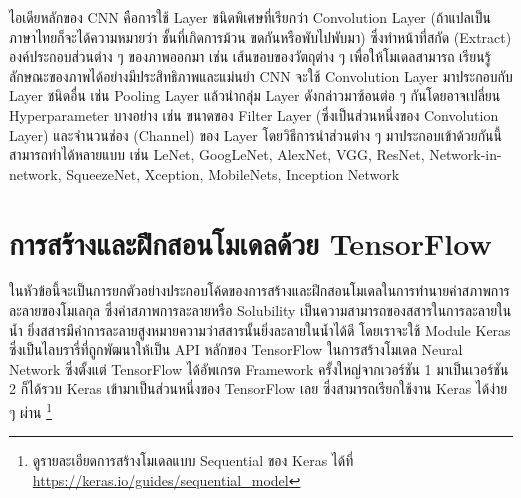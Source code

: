 ไอเดียหลักของ CNN คือการใช้ Layer ชนิดพิเศษที่เรียกว่า Convolution Layer (ถ้าแปลเป็นภาษาไทยก็จะได้ความหมายว่า ชั้นที่เกิดการม้วน%
ขดกันหรือพับไปพับมา) ซึ่งทำหน้าที่สกัด (Extract) องค์ประกอบส่วนต่าง ๆ ของภาพออกมา เช่น เส้นขอบของวัตถุต่าง ๆ เพื่อให้โมเดลสามารถ%
เรียนรู้ลักษณะของภาพได้อย่างมีประสิทธิภาพและแม่นยำ CNN จะใช้ Convolution Layer มาประกอบกับ Layer ชนิดอื่น เช่น Pooling Layer
แล้วนำกลุ่ม Layer ดังกล่าวมาซ้อนต่อ ๆ กันโดยอาจเปลี่ยน Hyperparameter บางอย่าง เช่น ขนาดของ Filter Layer (ซึ่งเป็นส่วนหนึ่งของ
Convolution Layer) และจำนวนช่อง (Channel) ของ Layer โดยวิธีการนำส่วนต่าง ๆ มาประกอบเข้าด้วยกันนี้สามารถทำได้หลายแบบ เช่น
LeNet, GoogLeNet, AlexNet, VGG, ResNet, Network-in-network, SqueezeNet, Xception, MobileNets, Inception Network

\section{การสร้างและฝึกสอนโมเดลด้วย TensorFlow}
\label{sec:train_tf}

ในหัวข้อนี้จะเป็นการยกตัวอย่างประกอบโค้ดของการสร้างและฝึกสอนโมเดลในการทำนายค่าสภาพการละลายของโมเลกุล ซึ่งค่าสภาพการละลายหรือ
Solubility เป็นความสามารถของสสารในการละลายในน้ำ ยิ่งสสารมีค่าการละลายสูงหมายความว่าสสารนั้นยิ่งละลายในน้ำได้ดี โดยเราจะใช้ Module
Keras ซึ่งเป็นไลบรารี่ที่ถูกพัฒนาให้เป็น API หลักของ TensorFlow ในการสร้างโมเดล Neural Network ซึ่งตั้งแต่ TensorFlow ได้อัพเกรด
Framework ครั้งใหญ่จากเวอร์ชัน 1 มาเป็นเวอร์ชัน 2 ก็ได้รวบ Keras เข้ามาเป็นส่วนหนึ่งของ TensorFlow เลย ซึ่งสามารถเรียกใช้งาน Keras
ได้ง่าย ๆ ผ่าน \footnote{ดูรายละเอียดการสร้างโมเดลแบบ Sequential ของ Keras ได้ที่
    \url{https://keras.io/guides/sequential_model}}

